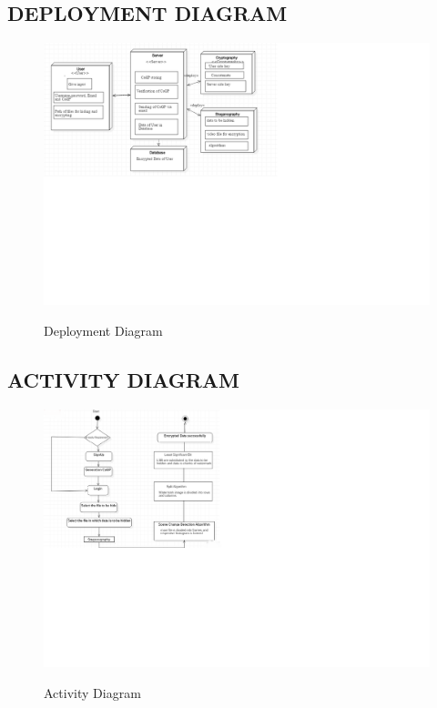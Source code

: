 \documentclass[12pt]{extreport}
\begin{document}
    \subsection{DEPLOYMENT DIAGRAM}
     \begin{figure}[H]
  \centering
  \includegraphics[scale=0.5]{deployment.png}\\
  \caption{Deployment Diagram}
  \end{figure}
  \pagebreak  
    \subsection{ACTIVITY DIAGRAM}
    \begin{figure}[H]
  \includegraphics[scale=0.7]{activ.png}\\
  \caption{Activity Diagram}
  
\end{figure}
    
\end{document}
